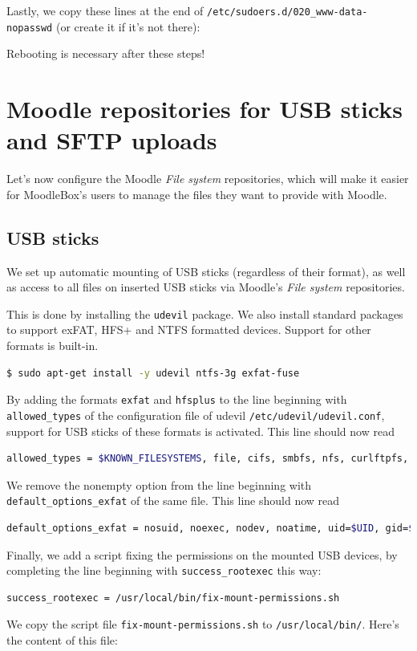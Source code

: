 \documentclass[12pt]{article}
\begin{document}
Lastly, we copy these lines at the end of \lstinline{/etc/sudoers.d/020_www-data-nopasswd} (or create it if it's not there):


Rebooting is necessary after these steps!

\section{Moodle repositories for USB sticks and SFTP uploads}

Let's now configure the Moodle \textsl{File system} repositories, which will make it easier for MoodleBox's users to manage the files they want to provide with Moodle.

\subsection{USB sticks}

We set up automatic mounting of USB sticks (regardless of their format), as well as access to all files on inserted USB sticks via Moodle's \textsl{File system} repositories.

This is done by installing the \lstinline{udevil} package.
We also install standard packages to support exFAT, HFS+ and NTFS formatted devices.
Support for other formats is built-in.

\begin{lstlisting}[language=bash]
$ sudo apt-get install -y udevil ntfs-3g exfat-fuse
\end{lstlisting}
By adding the formats \lstinline{exfat} and \lstinline{hfsplus} to the line beginning with \lstinline{allowed_types} of the configuration file of udevil \lstinline{/etc/udevil/udevil.conf}, support for USB sticks of these formats is activated.
This line should now read
\begin{lstlisting}[language=bash]
allowed_types = $KNOWN_FILESYSTEMS, file, cifs, smbfs, nfs, curlftpfs, ftpfs, sshfs, davfs, tmpfs, ramfs, exfat, hfsplus
\end{lstlisting}
We remove the nonempty option from the line beginning with \lstinline{default_options_exfat} of the same file.
This line should now read
\begin{lstlisting}[language=bash]
default_options_exfat = nosuid, noexec, nodev, noatime, uid=$UID, gid=$GID, iocharset=utf8
\end{lstlisting}
Finally, we add a script fixing the permissions on the mounted USB devices, by completing the line beginning with \lstinline{success_rootexec} this way:
\begin{lstlisting}[language=bash]
success_rootexec = /usr/local/bin/fix-mount-permissions.sh
\end{lstlisting}
We copy the script file \lstinline{fix-mount-permissions.sh} to \lstinline{/usr/local/bin/}.
Here's the content of this file:

\end{document}
